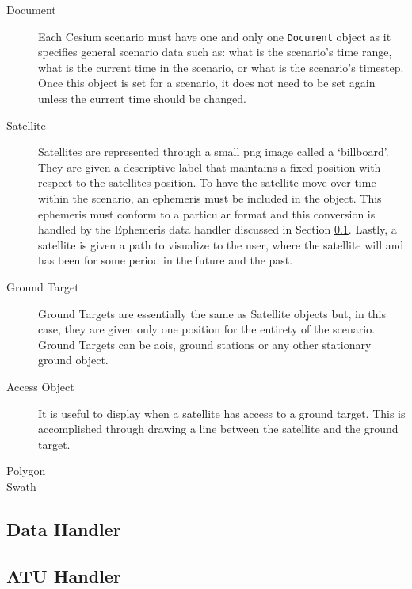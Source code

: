 \begin{description} 

    \item[Document] Each Cesium scenario must have one and only one
	\texttt{Document} object as it specifies general scenario data such as:
	what is the scenario's time range, what is the current time in the
	scenario, or what is the scenario's timestep. Once this object is set
	for a scenario, it does not need to be set again unless the current
	time should be changed.

    \item[Satellite] Satellites are represented through a small \gls{png} image
	called a `billboard'. They are given a descriptive label that maintains
	a fixed position with respect to the satellites position. To have the
	satellite move over time within the scenario, an ephemeris must be
	included in the object. This ephemeris must conform to a particular
	format and this conversion is handled by the Ephemeris data handler
	discussed in Section \ref{sec:data_handler}. Lastly, a satellite is
	given a path to visualize to the user, where the satellite will and has
	been for some period in the future and the past.

    \item[Ground Target] Ground Targets are essentially the same as Satellite
	objects but, in this case, they are given only one position for the
	entirety of the scenario. Ground Targets can be \glspl{aoi}, ground
	stations or any other stationary ground object.

    \item[Access Object] It is useful to display when a satellite has access to
	a ground target. This is accomplished through drawing a line between
	the satellite and the ground target. 

    \item[Polygon]

    \item[Swath]

\end{description}





\subsection{Data Handler}\label{sec:data_handler}

\subsection{ATU Handler}

